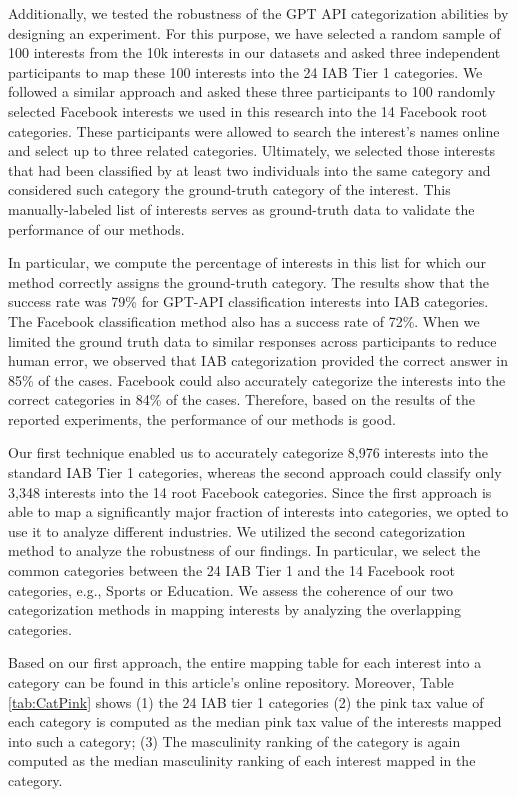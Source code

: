 \documentclass[twocolumn]{bmcart}\usepackage{lineno}
\begin{document}
\color{blue} Additionally, we tested the robustness of the GPT API categorization abilities by designing an experiment.
For this purpose, we have selected a random sample of 100 interests from the 10k interests in our datasets and asked three independent participants to map these 100 interests into the 24 IAB Tier 1 categories. We followed a similar approach and asked these three participants to 100 randomly selected Facebook interests we used in this research into the 14 Facebook root categories. These participants were allowed to search the interest's names online and select up to three related categories. 
Ultimately, we selected those interests that had been classified by at least two individuals into the same category and considered such category the ground-truth category of the interest. This manually-labeled list of interests serves as ground-truth data to validate the performance of our methods. 

In particular, we compute the percentage of interests in this list for which our method correctly assigns the ground-truth category. The results show that the success rate was 79\% for GPT-API classification interests into IAB categories. The Facebook classification method also has a success rate of 72\%. When we limited the ground truth data to similar responses across participants to reduce human error, we observed that IAB categorization provided the correct answer in 85\% of the cases. Facebook could also accurately categorize the interests into the correct categories in 84\% of the cases. Therefore, based on the results of the reported experiments, the performance of our methods is good.
\color{black} 

Our first technique enabled us to accurately categorize 8,976 interests into the standard IAB Tier 1 categories, whereas the second approach could classify only 3,348 interests into the 14 root Facebook categories. Since the first approach is able to map a significantly major fraction of interests into categories, we opted to use it to analyze different industries. We utilized the second categorization method to analyze the robustness of our findings. In particular, we select the common categories between the 24 IAB Tier 1 and the 14 Facebook root categories, e.g., Sports or Education. We assess the coherence of our two categorization methods in mapping interests by analyzing the overlapping categories.


Based on our first approach, the entire mapping table for each interest into a category can be found in this article's online repository. Moreover, Table \ref{tab:CatPink} shows (1) the 24  IAB tier 1 categories 
(2) the pink tax value of each category is computed as the median pink tax value of the interests mapped into such a category; (3) The masculinity ranking of the category is again computed as the median masculinity ranking of each interest mapped in the category.
\end{document}

